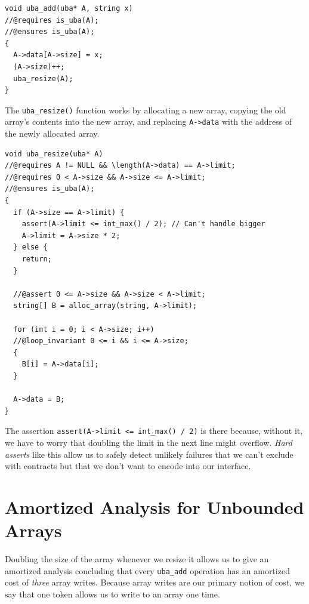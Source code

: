 \begin{lstlisting}[language={[C0]C}]
void uba_add(uba* A, string x)
//@requires is_uba(A);
//@ensures is_uba(A);
{
  A->data[A->size] = x;
  (A->size)++;
  uba_resize(A);
}
\end{lstlisting}
The \lstinline'uba_resize()' function works by allocating a new array,
copying the old array's contents into the new array, and replacing
\lstinline'A->data' with the address of the newly allocated array.

\begin{lstlisting}[language={[C0]C}]
void uba_resize(uba* A)
//@requires A != NULL && \length(A->data) == A->limit;
//@requires 0 < A->size && A->size <= A->limit;
//@ensures is_uba(A);
{
  if (A->size == A->limit) {
    assert(A->limit <= int_max() / 2); // Can't handle bigger
    A->limit = A->size * 2;
  } else {
    return;
  }

  //@assert 0 <= A->size && A->size < A->limit;
  string[] B = alloc_array(string, A->limit);

  for (int i = 0; i < A->size; i++)
  //@loop_invariant 0 <= i && i <= A->size;
  {
    B[i] = A->data[i];
  }

  A->data = B;
}
\end{lstlisting}
The assertion \lstinline'assert(A->limit <= int_max() / 2)' is there
because, without it, we have to worry that doubling the limit in the
next line might overflow. \emph{Hard asserts} like this allow us to
safely detect unlikely failures that we can't exclude with contracts
but that we don't want to encode into our interface.


\section{Amortized Analysis for Unbounded Arrays}
\label{sec:ubarrays:uba_analysis}

Doubling the size of the array whenever we resize it allows us to give
an amortized analysis concluding that every \lstinline'uba_add'
operation has an amortized cost of \emph{three} array writes. Because
array writes are our primary notion of cost, we say that one token
allows us to write to an array one time.

